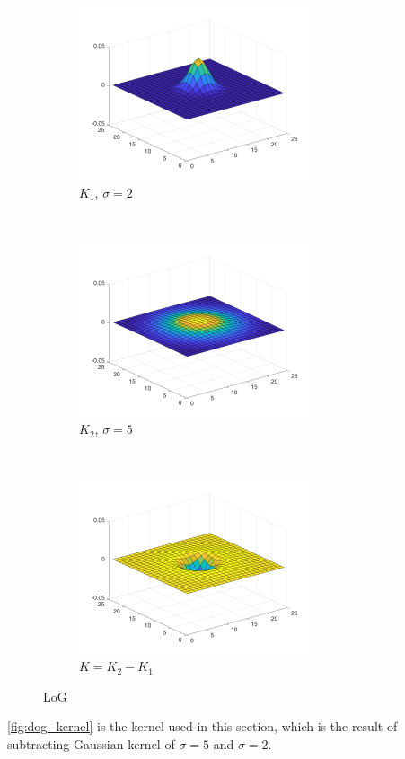 \documentclass[12pt]{article}
\begin{document}
\begin{figure}[H]
    \centering
    \begin{subfigure}[t]{0.3\textwidth}
        \centering
        \includegraphics[height=2in]{images/dog_s2}
        \caption{$K_1$, $\sigma=2$}
    \end{subfigure}%
    ~ 
    \begin{subfigure}[t]{0.3\textwidth}
        \centering
        \includegraphics[height=2in]{images/dog_s5}
        \caption{$K_2$, $\sigma=5$}
    \end{subfigure}%
    ~
    \begin{subfigure}[t]{0.3\textwidth}
        \centering
        \includegraphics[height=2in]{images/dog_kernel}
        \caption{$K = K_2-K_1$}
    \end{subfigure}
    \caption{LoG}
    \label{fig:dog_kernel}
\end{figure}

\autoref{fig:dog_kernel} is the kernel used in this section, which is the result of subtracting Gaussian kernel of $\sigma = 5$ and $\sigma=2$.
\end{document}
